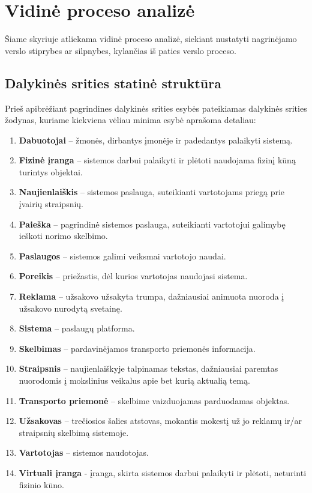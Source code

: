 \documentclass[12pt]{article}
\begin{document}
	\section{Vidinė proceso analizė}
	
	Šiame skyriuje atliekama vidinė proceso analizė, siekiant nustatyti nagrinėjamo verslo stiprybes ar silpnybes, kylančias iš paties verslo proceso.
	
	\subsection{Dalykinės srities statinė struktūra}
	
	Prieš apibrėžiant pagrindines dalykinės srities esybės pateikiamas dalykinės srities žodynas, kuriame kiekviena vėliau minima esybė aprašoma detaliau:
	
	\begin{enumerate}
		\item{\textbf{Dabuotojai} – žmonės, dirbantys įmonėje ir padedantys palaikyti sistemą.}
		\item{\textbf{Fizinė įranga} – sistemos darbui palaikyti ir plėtoti naudojama fizinį kūną turintys objektai.}
		\item{\textbf{Naujienlaiškis} – sistemos paslauga, suteikianti vartotojams priegą prie įvairių straipsnių.}
		\item{\textbf{Paieška} – pagrindinė sistemos paslauga, suteikianti vartotojui galimybę ieškoti norimo skelbimo.}
		\item{\textbf{Paslaugos} – sistemos galimi veiksmai vartotojo naudai.}
		\item{\textbf{Poreikis} – priežastis, dėl kurios vartotojas naudojasi sistema.}
		\item{\textbf{Reklama} – užsakovo užsakyta trumpa, dažniausiai animuota nuoroda į užsakovo nurodytą svetainę.}
		\item{\textbf{Sistema} – paslaugų platforma.}
		\item{\textbf{Skelbimas} – pardavinėjamos transporto priemonės informacija.}
		\item{\textbf{Straipsnis} – naujienlaiškyje talpinamas tekstas, dažniausiai paremtas nuorodomis į mokslinius veikalus apie bet kurią aktualią temą.}
		\item{\textbf{Transporto priemonė} – skelbime vaizduojamas parduodamas objektas.}
		\item{\textbf{Užsakovas} – trečiosios šalies atstovas, mokantis mokestį už jo reklamų ir/ar straipsnių skelbimą sistemoje.}
		\item{\textbf{Vartotojas} – sistemos naudotojas.}
		\item{\textbf{Virtuali įranga} -  įranga, skirta sistemos darbui palaikyti ir plėtoti, neturinti fizinio kūno.}
	\end{enumerate}
	
\end{document}
